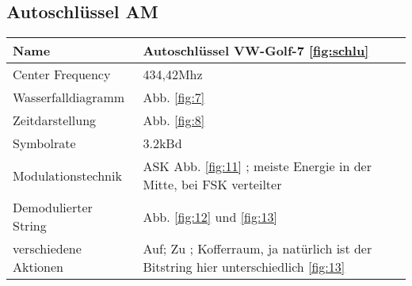 \documentclass[12pt,a4paper]{article}
\begin{document}
\subsection{Autoschlüssel AM}
\begin{table}[H]
\begin{tabular}{|l|l|}
\hline
Name & Autoschlüssel VW-Golf-7 \ref{fig:schlu} \\
\hline
Center Frequency& 434,42Mhz \\
\hline
Wasserfalldiagramm & Abb. \ref{fig:7} \\
\hline
Zeitdarstellung & Abb. \ref{fig:8} \\
\hline
Symbolrate & 3.2kBd  \\
\hline
Modulationstechnik & ASK Abb. \ref{fig:11} ; meiste Energie in der Mitte, bei FSK verteilter \\
\hline
Demodulierter String &   Abb. \ref{fig:12} und \ref{fig:13}\\
\hline
verschiedene Aktionen & Auf; Zu ; Kofferraum, ja natürlich ist der Bitstring hier unterschiedlich \ref{fig:13}\\
\hline
\end{tabular}
\end{table}
\end{document}
